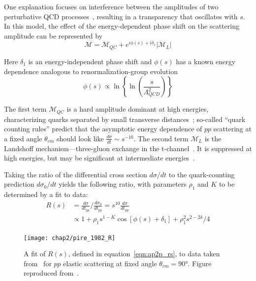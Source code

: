 One explanation focuses on interference between the amplitudes of two
perturbative QCD processes~\cite{Ralston_1988}, resulting in a transparency
that oscillates with $s$.
In this model, the effect of the energy-dependent phase shift on the scattering amplitude can be represented by
\begin{equation}
    \mathcal{M} = \mathcal{M}_{QC} + e^{i\phi(s) + i \delta_1}\left|\mathcal{M}_L\right|
\end{equation}

Here $\delta_1$ is an energy-independent phase shift and $\phi(s)$ has a known
energy dependence analogous to renormalization-group
evolution~\cite{Pire_1982, Ralston_1982, Sen_1983}
\begin{equation}
    \phi(s) \propto \ln\left\{ \ln \left( \frac{s}{\Lambda_{QCD}^2} \right) \right\}
\end{equation}


The first term $\mathcal{M}_{QC}$ is a hard amplitude dominant at high energies,
characterizing quarks separated by small transverse
distances~\cite{Brodsky_1973, Brodsky_1975, Matveev_1973, Lepage_1980};
so-called ``quark counting rules'' predict that the asymptotic energy
dependence of $pp$ scattering at a fixed angle $\theta_{cm}$ should look like
$\frac{d\sigma}{dt}\sim s^{-10}$.
The second term $\mathcal{M}_L$ is the Landshoff mechanism---three-gluon exchange in the
t-channel~\cite{Landshoff_1974, Landshoff_1980}.
It is suppressed at high energies, but may be significant at intermediate
energies~\cite{Mueller_1981}.


Taking the ratio of the differential cross section $d\sigma/dt$ to the
quark-counting prediction $d\sigma_0/dt$
yields the following ratio, with parameters $\rho_1$ and $K$ to be determined
by a fit to data:
\begin{align} \label{eqn:ap2p_rs}
    R(s) &= \frac{d\sigma}{dt_{pp}} \bigg/ \frac{d\sigma_0}{dt_{pp}}
          = s^{10} \frac{d\sigma}{dt_{pp}} \\
         &\propto 1 + \rho_1 s^{1-K} \cos\left[\phi(s)+\delta_1\right] + \rho_1^2 s^{2-2k}/4
\end{align}

\begin{figure}[!h]
    \centering
    \texttt{[image: chap2/pire\_1982\_R]}
    \caption[Fit ratio of the differential cross section $d\sigma/dt$ to the
quark-counting prediction $d\sigma_0/dt$.]{A fit of $R(s)$, defined in equation~\ref{eqn:ap2p_rs}, to data taken from~\cite{Sivers_1976}
             for $pp$ elastic scattering at fixed angle
             $\theta_{cm}=\ang{90}$.
             Figure reproduced from~\cite{Pire_1982}.
            }
    \label{fig:pire_1982_R}
\end{figure}

